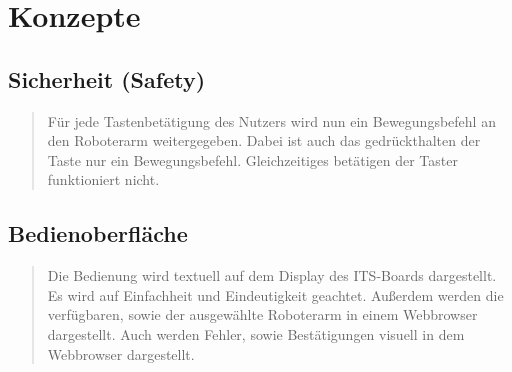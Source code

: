\chapter{Konzepte}
\begin{quote}
	
\end{quote}

	
	
	

\section{Sicherheit (Safety)}
\begin{quote}
Für jede Tastenbetätigung des Nutzers wird nun ein Bewegungsbefehl an den Roboterarm weitergegeben.
Dabei ist auch das gedrückthalten der Taste nur ein Bewegungsbefehl. Gleichzeitiges betätigen der Taster funktioniert nicht. 
\end{quote}
\section{Bedienoberfläche}
\begin{quote}
	Die Bedienung wird textuell auf dem Display des ITS-Boards dargestellt. Es wird auf Einfachheit und Eindeutigkeit geachtet. Außerdem werden die verfügbaren, sowie der ausgewählte Roboterarm in einem Webbrowser dargestellt.
	Auch werden Fehler, sowie Bestätigungen visuell in dem Webbrowser dargestellt.
	
\end{quote}


